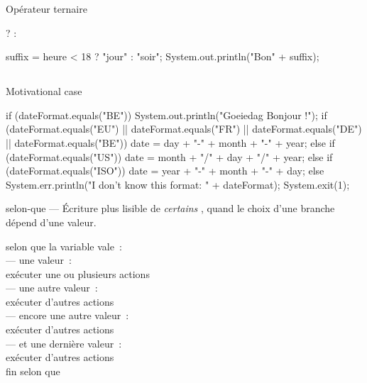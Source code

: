 \begin{hideedit}
\begin{frame}[fragile]{Opérateur ternaire}
\begin{grammaire}
     ?  : 
\end{grammaire}
\vfill
\pause
\begin{java}
suffix = heure < 18 ? "jour" : "soir";
System.out.println("Bon" + suffix);
\end{java}
\end{frame}

\subsection{}
\begin{frame}[fragile]{Motivational case}
\begin{java}
if (dateFormat.equals("BE"))
    System.out.println("Goeiedag Bonjour !");
if (dateFormat.equals("EU") || dateFormat.equals("FR")
        || dateFormat.equals("DE")
        || dateFormat.equals("BE")) {
    date = day + "-" + month + "-" + year;
} else if (dateFormat.equals("US")) {
    date = month + "/" + day + "/" + year;
} else if (dateFormat.equals("ISO")) {
    date = year + "-" + month + "-" + day;
} else {
    System.err.println("I don't know this format: "
            + dateFormat);
    System.exit(1);
}
\end{java}
\end{frame}

\begin{frame}{selon-que --- }
  Écriture plus lisible de \emph{certains} , quand le
  choix d’une branche dépend d'une valeur.

  \begin{langagenaturel}
    selon que la variable vale~:\\
      \tab — une valeur~:\\
        \tab\tab exécuter une ou plusieurs actions\\
      \tab — une autre valeur~:\\
        \tab\tab exécuter d'autres actions\\
      \tab — encore une autre valeur~:\\
        \tab\tab exécuter d'autres actions\\
      \tab — et une dernière valeur~:\\
        \tab\tab exécuter d'autres actions\\
    fin selon que
  \end{langagenaturel}
\end{frame}


\end{hideedit}
